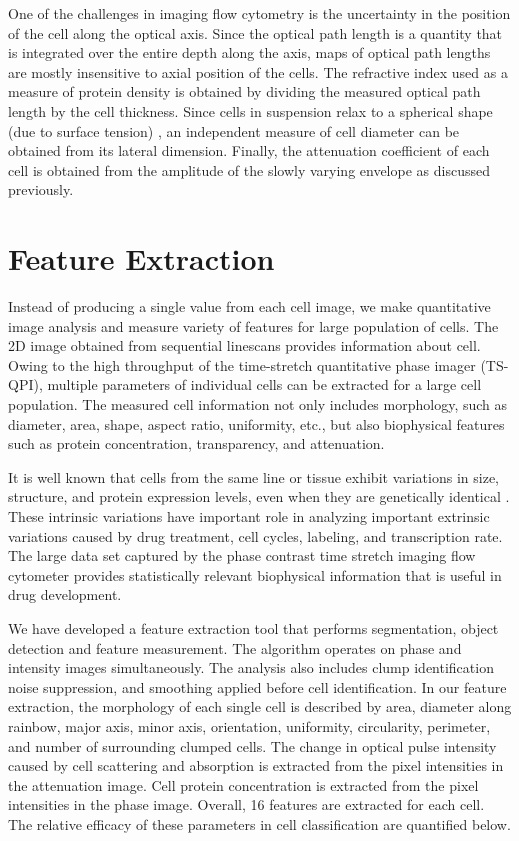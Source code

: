 \documentclass[aps,pra,reprint,superscriptaddress]{revtex4-1}
\begin{document}
One of the challenges in imaging flow cytometry is the uncertainty in the position of the cell along the optical axis. Since the optical path length is a quantity that is integrated over the entire depth along the axis, maps of optical path lengths are mostly insensitive to axial position of the cells. The refractive index used as a measure of protein density is obtained by dividing the measured optical path length by the cell thickness. Since cells in suspension relax to a spherical shape (due to surface tension) \cite{revel1974adhesion,whur1977substrate}, an independent measure of cell diameter can be obtained from its lateral dimension. 
Finally, the attenuation coefficient of each cell is obtained from the amplitude of the slowly varying envelope as discussed previously.

\section{Feature Extraction}

Instead of producing a single value from each cell image, we make quantitative image analysis and measure variety of features for large population of cells. The 2D image obtained from sequential linescans provides information about cell. Owing to the high throughput of the time-stretch quantitative phase imager (TS-QPI), multiple parameters of individual cells can be extracted for a large cell population. The measured cell information not only includes morphology, such as diameter, area, shape, aspect ratio, uniformity, etc., but also biophysical features such as protein concentration, transparency, and attenuation.

It is well known that cells from the same line or tissue exhibit variations in size, structure, and protein expression levels, even when they are genetically identical \cite{CPpaper}. These intrinsic variations have important role in analyzing important extrinsic variations caused by drug treatment, cell cycles, labeling, and transcription rate. The large data set captured by the phase contrast time stretch imaging flow cytometer provides statistically relevant biophysical information that is useful in drug development.

We have developed a feature extraction tool that performs segmentation, object detection and feature measurement. The algorithm operates on phase and intensity images simultaneously. The analysis also includes clump identification noise suppression, and smoothing applied before cell  identification. In our feature extraction, the morphology of each single cell is described by area, diameter along rainbow, major axis, minor axis, orientation, uniformity, circularity, perimeter, and number of surrounding clumped cells. The change in optical pulse intensity caused by cell scattering and absorption is extracted from the pixel intensities in the attenuation image. Cell protein concentration is extracted from the pixel intensities in the phase image. Overall, 16 features are extracted for each cell. The relative efficacy of these parameters in cell classification are quantified below.
\end{document}
